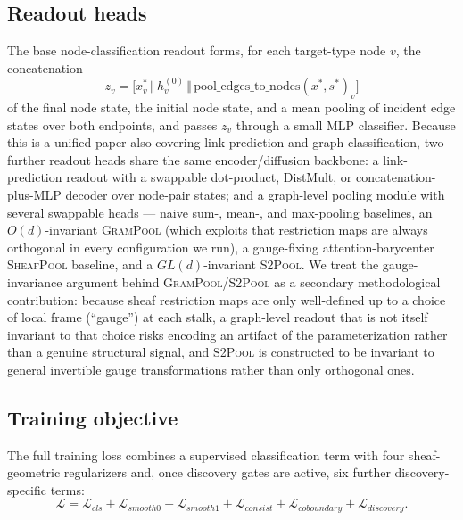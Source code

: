 \documentclass{article}
\begin{document}
\subsection{Readout heads}

The base node-classification readout forms, for each target-type node $v$, the concatenation
\begin{equation}
  z_v = \big[x^*_v \,\Vert\, h^{(0)}_v \,\Vert\, \mathrm{pool\_edges\_to\_nodes}(x^*,s^*)_v\big]
\end{equation}
of the final node state, the initial node state, and a mean pooling of incident edge states over
both endpoints, and passes $z_v$ through a small MLP classifier. Because this is a unified paper
also covering link prediction and graph classification, two further readout heads share the same
encoder/diffusion backbone: a link-prediction readout with a swappable dot-product, DistMult, or
concatenation-plus-MLP decoder over node-pair states; and a graph-level pooling module with several
swappable heads --- naive sum-, mean-, and max-pooling baselines, an $O(d)$-invariant \textsc{GramPool}
(which exploits that restriction maps are always orthogonal in every configuration we run), a
gauge-fixing attention-barycenter \textsc{SheafPool} baseline, and a $GL(d)$-invariant \textsc{S2Pool}.
We treat the gauge-invariance argument behind \textsc{GramPool}/\textsc{S2Pool} as a secondary
methodological contribution: because sheaf restriction maps are only well-defined up to a choice of
local frame (``gauge'') at each stalk, a graph-level readout that is not itself invariant to that
choice risks encoding an artifact of the parameterization rather than a genuine structural signal,
and \textsc{S2Pool} is constructed to be invariant to general invertible gauge transformations
rather than only orthogonal ones.

\subsection{Training objective}

The full training loss combines a supervised classification term with four sheaf-geometric
regularizers and, once discovery gates are active, six further discovery-specific terms:
\begin{equation}
  \mathcal{L} = \mathcal{L}_{cls} + \mathcal{L}_{smooth0} + \mathcal{L}_{smooth1} + \mathcal{L}_{consist} + \mathcal{L}_{coboundary} + \mathcal{L}_{discovery}.
\end{equation}
\end{document}

